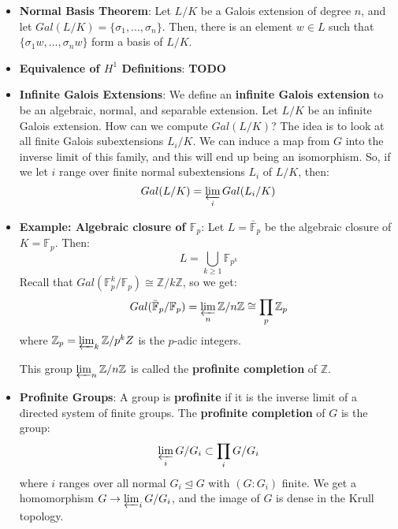 \documentclass[11pt, oneside]{amsart}   	%
\theoremstyle{definition}
\begin{document}
\begin{itemize}
\begin{proof}
	\end{proof}
	
	Note this is stronger than the earlier statement of the theorem. Suppose that $G$ is cyclic and $G = \langle\sigma\rangle$. Then we may define $a_1 = 
	1, a_\sigma = a, a_{\sigma^2} = a\sigma(a) = a\sigma a, ..., a_{\sigma^i} = a\sigma(a)\sigma^2(a)...\sigma^{i - 1}(a)$. We have $a_{\sigma^n} = N(a)$, 
	so if $N(a) = 1\implies a_{\sigma^n} = 1$ and $\{a_{\sigma^i}\}$ is a 1-cocycle, which implies it is a 1-coboundary. Thus, there is some $b\in L^*$ with 
	$a_{\sigma^i} = b / \sigma^ib$ for every $i$, and in particular for $i = 1$ this gives $a_\sigma = a = b / \sigma b$.
	
	\item \textbf{Normal Basis Theorem}: Let $L / K$ be a Galois extension of degree $n$, and let $Gal(L / K) = \{\sigma_1, ..., \sigma_n\}$. Then, there is 
	an element $w\in L$ such that $\{\sigma_1w, ..., \sigma_nw\}$ form a basis of $L / K$. 
	
	\item \textbf{Equivalence of $H^1$ Definitions}: \textbf{TODO}
	
	\item \textbf{Infinite Galois Extensions}: We define an \textbf{infinite Galois extension} to be an algebraic, normal, and separable extension. Let $L / K$ 
	be an infinite Galois extension. How can we compute $Gal(L / K)$? The idea is to look at all finite Galois subextensions $L_i / K$. We can induce a 
	map from $G$ into the inverse limit of this family, and this will end up being an isomorphism. So, if we let $i$ range over finite normal subextensions 
	$L_i$ of $L / K$, then:
	$$
		Gal(L / K) = \varprojlim_i Gal(L_i / K)
	$$
	
	\item \textbf{Example: Algebraic closure of $\mathbb F_p$}: Let $L = \bar{\mathbb F}_p$ be the algebraic closure of $K = \mathbb F_p$. Then:
	$$
		L = \bigcup_{k\geq 1}\mathbb F_{p^k}
	$$
	Recall that $Gal(\mathbb F_p^k / \mathbb F_p)\cong \mathbb Z / k\mathbb Z$, so we get:
	$$
		Gal(\bar{\mathbb F}_p / \mathbb F_p) = \varprojlim_n\mathbb Z / n\mathbb Z\cong \prod_p\mathbb Z_p
	$$
	where $\mathbb Z_p = \varprojlim_k \mathbb Z / p^k Z$ is the $p$-adic integers. 
	
	This group $\varprojlim_n\mathbb Z / n\mathbb Z$ is called the \textbf{profinite completion} of $\mathbb Z$. 
	
	\item \textbf{Profinite Groups}: A group is \textbf{profinite} if it is the inverse limit of a directed system of finite groups. The \textbf{profinite completion} 
	of $G$ is the group:
	$$
		\varprojlim_i G / G_i\subset \prod_i G / G_i
	$$
	where $i$ ranges over all normal $G_i\trianglelefteq G$ with $(G : G_i)$ finite. We get a homomorphism $G\rightarrow \varprojlim_i G / G_i$, and the 
	image of $G$ is dense in the Krull topology. 
	

\end{itemize}
\end{document}

